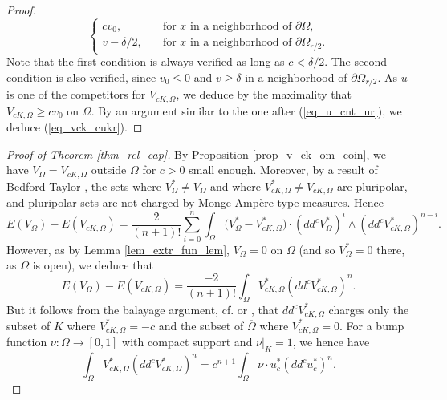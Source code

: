 \documentclass[12pt]{article}
\numberwithin{equation}{section}
\theoremstyle{theorem}
\theoremstyle{definition}
\theoremstyle{remark}
\begin{document}
\begin{proof}
\begin{equation}
\begin{cases}
				c v_0, \quad &\text{for $x$ in a neighborhood of $\partial \Omega$},
				\\
				v - \delta/2, \quad &\text{for $x$ in a neighborhood of $\partial \Omega_{r/2}$.}
			\end{cases} 
		\end{equation}
		Note that the first condition is always verified as long as $c < \delta/2$.
		The second condition is also verified, since $v_0 \leq 0$ and $v \geq \delta$ in a neighborhood of $\partial \Omega_{r/2}$.
		As $u$ is one of the competitors for $V_{cK, \Omega}$, we deduce by the maximality that $V_{cK, \Omega} \geq c v_0$ on $\Omega$.
		By an argument similar to the one after (\ref{eq_u_cnt_ur}), we deduce (\ref{eq_vck_cukr}).
	\end{proof}
	
	\begin{proof}[Proof of Theorem \ref{thm_rel_cap}]
		By Proposition \ref{prop_v_ck_om_coin}, we have $V_{\Omega} = V_{cK, \Omega}$ outside $\Omega$ for $c > 0$ small enough. Moreover, by a result of Bedford-Taylor \cite{BedfordTaylor}, the sets where $V_{\Omega}^* \neq V_{\Omega}$ and where $V_{cK, \Omega}^* \neq V_{cK, \Omega}$ are pluripolar, and pluripolar sets are not charged by Monge-Amp\`ere-type measures. Hence
		\begin{equation}
			E(V_{\Omega}) - E(V_{c K, \Omega})
			=
			\frac{2}{(n + 1)!}
			\sum_{i = 0}^{n} \int_{\Omega} \big( V_{\Omega}^* - V_{c K, \Omega}^* \big)
			 \cdot (dd^c V_{\Omega}^*)^i \wedge (dd^c V_{c K, \Omega}^*)^{n - i}.
		\end{equation}
		However, as by Lemma \ref{lem_extr_fun_lem}, $V_{\Omega} = 0$ on $\Omega$ (and so $V_{\Omega}^* = 0$ there, as $\Omega$ is open), we deduce that
		\begin{equation}
			E(V_{\Omega}) - E(V_{c K, \Omega})
			=
			\frac{-2}{(n + 1)!}
			\int_{\Omega} V_{c K, \Omega}^* (dd^c V_{c K, \Omega}^*)^{n}.
		\end{equation}
		But it follows from the balayage argument, cf. \cite[Corollary 9.2]{BedfordTaylor} or \cite[Lemma 2.3]{GuedjLuZeriahEnv}, that $dd^c V_{c K, \Omega}^*$ charges only the subset of $K$ where $V_{c K, \Omega}^* = - c$ and the subset of $\overline{\Omega}$ where $V_{c K, \Omega}^* = 0$.
		For a bump function $\nu: \Omega \to [0, 1]$ with compact support and $\nu|_K = 1$, we hence have
		\begin{equation}\label{eq_rho_int1}
			\int_{\Omega} V_{c K, \Omega}^* (dd^c V_{c K, \Omega}^*)^{n}
			=
			c^{n + 1}
			\int_{\Omega} \nu \cdot u_c^* (dd^c u_c^*)^{n}.

\end{equation}
\end{proof}
\end{document}
